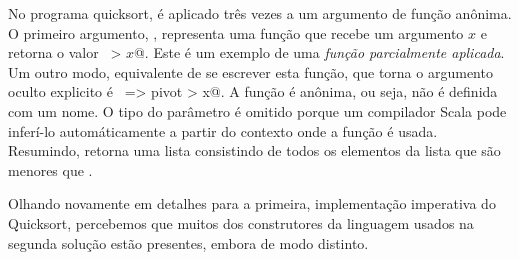 No programa quicksort,  \'{e} aplicado tr\^{e}s vezes a um argumento 
de fun\c{c}\~{a}o an\^{o}nima. O primeiro argumento, , representa uma 
fun\c{c}\~{a}o que recebe um argumento $x$ e retorna o valor ~\lstinline@pivot > $x$@.
Este \'{e} um exemplo de uma {\em fun\c{c}\~{a}o parcialmente aplicada}. Um outro modo, 
equivalente de se escrever esta fun\c{c}\~{a}o, que torna o argumento oculto explicito
\'{e} ~\lstinline@x => pivot > x@. A fun\c{c}\~{a}o \'{e} an\^{o}nima, ou seja, n\~{a}o \'{e} definida
com um nome. O tipo do par\^{a}metro   \'{e} omitido porque um compilador Scala 
pode infer\'{i}-lo autom\'{a}ticamente a partir do contexto onde a fun\c{c}\~{a}o \'{e} usada.
Resumindo,  retorna uma lista consistindo de todos os 
elementos da lista  que s\~{a}o menores que .  

Olhando novamente em detalhes para a primeira, implementa\c{c}\~{a}o imperativa
do Quicksort, percebemos que muitos dos construtores da linguagem 
usados na segunda solu\c{c}\~{a}o est\~{a}o presentes, embora de modo distinto.



